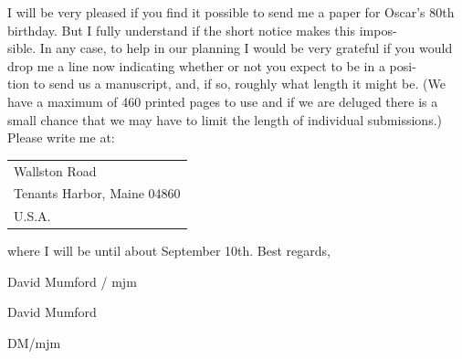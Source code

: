 I will be very pleased if you find it possible to send me a paper for Oscar's 80th birthday. But I fully understand if the short notice makes this impos-\\
sible. In any case, to help in our planning I would be very grateful if you would drop me a line now indicating whether or not you expect to be in a posi-\\
tion to send us a manuscript, and, if so, roughly what length it might be. (We have a maximum of 460 printed pages to use and if we are deluged there is a small chance that we may have to limit the length of individual submissions.) Please write me at:
\begin{tabular}{l}
Wallston Road\\
Tenants Harbor, Maine 04860\\
U.S.A.
\end{tabular}
where I will be until about September 10th.
Best regards,

David Mumford / mjm

David Mumford

DM/mjm
